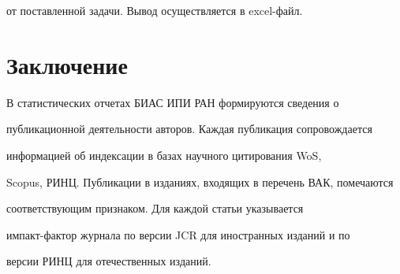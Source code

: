 от поставленной задачи. Вывод осуществляется в excel-файл.











\section{Заключение}










    В статистических отчетах БИАС ИПИ РАН формируются сведения о


публикационной деятельности авторов. Каждая пуб\-ли\-ка\-ция сопровождается


информацией об индексации в базах научного цитирования WoS,


Scopus, РИНЦ. Публикации в изданиях, входящих в перечень ВАК, помечаются


соответствующим признаком. Для каж\-дой статьи указывается


  им\-пакт-фак\-тор журнала по версии JCR для иностранных изданий и по


версии РИНЦ для отечественных изданий.








